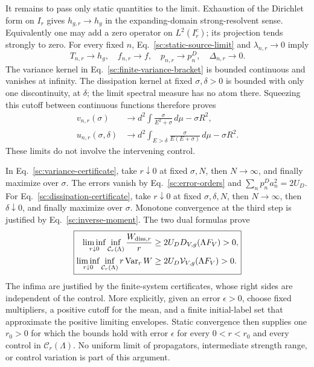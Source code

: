\documentclass[aps,prl,reprint,superscriptaddress,longbibliography]{revtex4-2}
\begin{document}
It remains to pass only static quantities to the limit. Exhaustion of
the Dirichlet form on $I_r$ gives $h_{g,r}\to h_g$ in the expanding-domain
strong-resolvent sense. Equivalently one may add a zero operator on
$L^2(I_r^c)$; its projection tends strongly to zero. For every fixed $n$,
Eq.~\eqref{sc:static-source-limit} and $\lambda_{n,r}\to0$ imply
\begin{equation}
 T_{n,r}\longrightarrow h_g,\quad f_{n,r}\longrightarrow f,\quad
 p_{n,r}\longrightarrow p_n^D,\quad \Delta_{n,r}\longrightarrow0.
 \label{sc:static-convergence}
\end{equation}
The variance kernel in Eq.~\eqref{sc:finite-variance-bracket} is bounded
continuous and vanishes at infinity. The dissipation kernel at fixed
$\sigma,\delta>0$ is bounded with only one discontinuity, at $\delta$;
the limit spectral measure has no atom there. Squeezing this cutoff
between continuous functions therefore proves
\begin{align}
 v_{n,r}(\sigma)&\longrightarrow
 d^2\int\frac{\sigma}{E^2+\sigma}\,d\mu-\sigma R^2,\\
 u_{n,r}(\sigma,\delta)&\longrightarrow
 d^2\int_{E>\delta}\frac{\sigma}{E(E+\sigma)}\,d\mu-\sigma R^2.
 \label{sc:bracket-limits}
\end{align}
These limits do not involve the intervening control.

In Eq.~\eqref{sc:variance-certificate}, take $r\downarrow0$ at fixed
$\sigma,N$, then $N\to\infty$, and finally maximize over $\sigma$.
The errors vanish by Eq.~\eqref{sc:error-orders} and
$\sum_np_n^Da_n^2=2U_D$. For Eq.~\eqref{sc:dissipation-certificate},
take $r\downarrow0$ at fixed $\sigma,\delta,N$, then $N\to\infty$,
then $\delta\downarrow0$, and finally maximize over $\sigma$.
Monotone convergence at the third step is justified by
Eq.~\eqref{sc:inverse-moment}. The two dual formulas prove
\begin{equation}
 \boxed{\begin{aligned}
 \liminf_{r\downarrow0}\inf_{\mathcal C_r(\Lambda)}
       \frac{W_{{\rm diss},r}}r
 &\ge2U_DD_{V,g}(\Lambda F_V)>0,\\
 \liminf_{r\downarrow0}\inf_{\mathcal C_r(\Lambda)}
       r\operatorname{Var}_rW
 &\ge2U_D\mathcal V_{V,g}(\Lambda F_V)>0.
 \end{aligned}}
 \label{sc:uniform-bounds}
\end{equation}
The infima are justified by the finite-system certificates, whose right
sides are independent of the control. More explicitly, given an error
$\epsilon>0$, choose fixed multipliers, a positive cutoff for the mean,
and a finite initial-label set that approximate the positive limiting
envelopes. Static convergence then supplies one $r_0>0$ for which the
bounds hold with error $\epsilon$ for every $0<r<r_0$ and every control
in $\mathcal C_r(\Lambda)$. No uniform limit of propagators, intermediate
strength range, or control variation is part of this argument.
\end{document}
